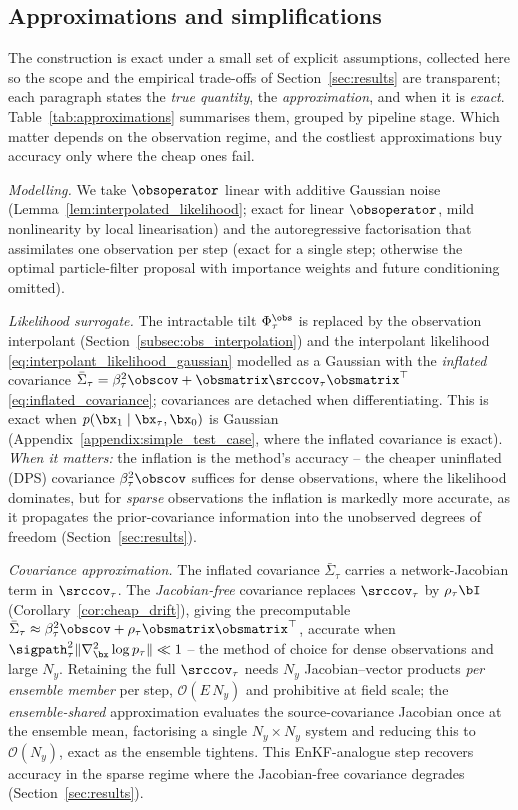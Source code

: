 \subsection{Approximations and simplifications}
\label{subsec:approximations}

The construction is exact under a small set of explicit assumptions, collected here so the scope and the empirical trade-offs of Section~\ref{sec:results} are transparent; each paragraph states the \emph{true quantity}, the \emph{approximation}, and when it is \emph{exact}. Table~\ref{tab:approximations} summarises them, grouped by pipeline stage. Which matter depends on the observation regime, and the costliest approximations buy accuracy only where the cheap ones fail.

\emph{Modelling.} We take $\obsoperator$ linear with additive Gaussian noise (Lemma~\ref{lem:interpolated_likelihood}; exact for linear $\obsoperator$, mild nonlinearity by local linearisation) and the autoregressive factorisation that assimilates one observation per step (exact for a single step; otherwise the optimal particle-filter proposal with importance weights and future conditioning omitted).

\emph{Likelihood surrogate.} The intractable tilt $\Phi_\tau^{\obs}$ is replaced by the observation interpolant (Section~\ref{subsec:obs_interpolation}) and the interpolant likelihood \eqref{eq:interpolant_likelihood_gaussian} modelled as a Gaussian with the \emph{inflated} covariance $\bar\Sigma_\tau=\beta_\tau^2\obscov+\obsmatrix\srccov_\tau\obsmatrix^\top$ \eqref{eq:inflated_covariance}; covariances are detached when differentiating. This is exact when $p(\bx_1\mid\bx_\tau,\bx_0)$ is Gaussian (Appendix~\ref{appendix:simple_test_case}, where the inflated covariance is exact). \emph{When it matters:} the inflation is the method's accuracy -- the cheaper uninflated (DPS) covariance $\beta_\tau^2\obscov$ suffices for dense observations, where the likelihood dominates, but for \emph{sparse} observations the inflation is markedly more accurate, as it propagates the prior-covariance information into the unobserved degrees of freedom (Section~\ref{sec:results}).

\emph{Covariance approximation.} The inflated covariance $\bar\Sigma_\tau$ carries a network-Jacobian term in $\srccov_\tau$. The \emph{Jacobian-free} covariance replaces $\srccov_\tau$ by $\rho_\tau\bI$ (Corollary~\ref{cor:cheap_drift}), giving the precomputable $\bar\Sigma_\tau\approx\beta_\tau^2\obscov+\rho_\tau\obsmatrix\obsmatrix^\top$, accurate when $\sigpath_\tau^2\|\nabla_{\bx}^2\log p_\tau\|\ll1$ -- the method of choice for dense observations and large $N_y$. Retaining the full $\srccov_\tau$ needs $N_y$ Jacobian--vector products \emph{per ensemble member} per step, $\mathcal{O}(E\,N_y)$ and prohibitive at field scale; the \emph{ensemble-shared} approximation evaluates the source-covariance Jacobian once at the ensemble mean, factorising a single $N_y\times N_y$ system and reducing this to $\mathcal{O}(N_y)$, exact as the ensemble tightens. This EnKF-analogue step recovers accuracy in the sparse regime where the Jacobian-free covariance degrades (Section~\ref{sec:results}).

